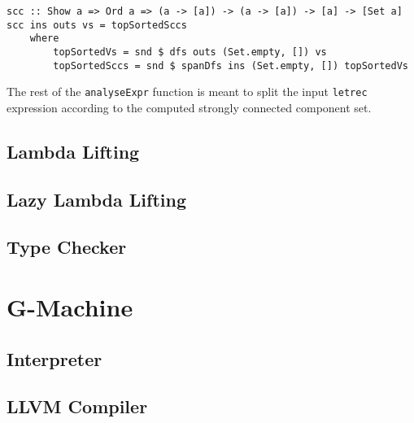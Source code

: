 \documentclass[a4paper]{report}
\begin{document}
\begin{lstlisting}
scc :: Show a => Ord a => (a -> [a]) -> (a -> [a]) -> [a] -> [Set a]
scc ins outs vs = topSortedSccs
    where
        topSortedVs = snd $ dfs outs (Set.empty, []) vs
        topSortedSccs = snd $ spanDfs ins (Set.empty, []) topSortedVs
\end{lstlisting}

The rest of the \texttt{analyseExpr} function is meant to split the input
\texttt{letrec} expression according to the computed strongly connected
component set.

\section{Lambda Lifting}
\section{Lazy Lambda Lifting}
\section{Type Checker}


\chapter{G-Machine}
\section{Interpreter}
\section{LLVM Compiler}



\end{document}
